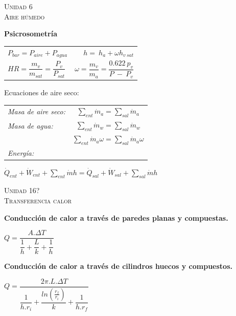 \documentclass[11pt,a4paper,twocolumn]{article}
\newcommand{\unidad}[2]{\begin{center}
		\fontsize{10}{10}\selectfont\color{gray!50!black}\scshape Unidad #1 \\
		\fontsize{14}{14}\selectfont \scshape #2
	\end{center} \vspace{-.5cm}}
\begin{document}
\unidad{6}{Aire húmedo}
\begin{tcolorbox}
	\textbf{Psicrosometría}\\ 
	
	\begin{tabular}{l r}
		$P_{bar}=P_{aire}+P_{agua}$& 
		$ h=~h_{a}+\omega h_{v~sat}$\\
		$HR=\dfrac{m_{v}}{m_{sat}}=\dfrac{P_{v}}{P_{sat}}$&$\omega=\dfrac{m_{v}}{m_{a}}=\dfrac{0.622~p_{v}}{P~-~P_{v}}$
	\end{tabular}
	\begin{center}
			Ecuaciones de aire seco:
	\end{center}
	\begin{tabular}{l c}
		\textit{Masa de aire seco:}& $\sum_{ent}\dot{m}_{a}=\sum_{sal}\dot{m}_{a}$\\
		\textit{Masa de agua:} & $\sum_{ent}\dot{m}_{w}=\sum_{sal}\dot{m}_{w}$ \\
		&  $\sum_{ent}\dot{m}_{a} \omega=\sum_{sal}\dot{m}_{a}\omega$\\
		\textit{Energía:} &\\	
	\end{tabular}
	\begin{center}
		 $ \dot{Q}_{ent}+\dot{W}_{ent}+\sum_{ent} \dot{m}h= \dot{Q}_{sal}+\dot{W}_{sal}+\sum_{sal} \dot{m}h$
	\end{center}

\end{tcolorbox}
		
		
	
	\unidad{16?}{Transferencia calor}
	\vspace{0.1cm}
	\begin{tcolorbox}
	\textbf{Conducción de calor a través de paredes planas y compuestas.}
	\begin{center}
		$Q=\dfrac{A.\Delta T}{\dfrac{1}{h}+\dfrac{L}{k}+\dfrac{1}{h}}$
	\end{center}

	\textbf{Conducción de calor a través de cilindros huecos y compuestos.}
	\begin{center}
		$Q=\dfrac{2 \pi.L.\Delta T}{\dfrac{1}{h.r_{i}}+\dfrac{ln\left(\frac{r_{f}}{r_{i}}\right)}{k}+\dfrac{1}{h.r_{f}}}$
	\end{center}
	\end{tcolorbox}
\end{document}
